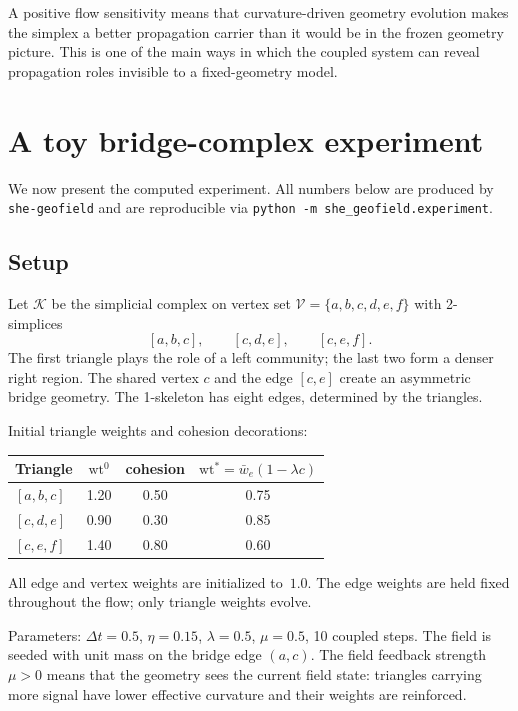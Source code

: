 \documentclass[11pt]{article}
\newcommand{\K}{\mathcal{K}}
\newcommand{\V}{\mathcal{V}}
\newcommand{\wt}{\mathrm{wt}}
\begin{document}
A positive flow sensitivity means that curvature-driven geometry evolution makes the simplex a better propagation carrier than it would be in the frozen geometry picture. This is one of the main ways in which the coupled system can reveal propagation roles invisible to a fixed-geometry model.

\section{A toy bridge-complex experiment}\label{sec:experiment}

We now present the computed experiment.  All numbers below are produced by \texttt{she-geofield} and are reproducible via \texttt{python -m she\_geofield.experiment}.

\subsection{Setup}

Let $\K$ be the simplicial complex on vertex set $\V=\{a,b,c,d,e,f\}$ with 2-simplices
\[
[a,b,c], \qquad [c,d,e], \qquad [c,e,f].
\]
The first triangle plays the role of a left community; the last two form a denser right region.  The shared vertex $c$ and the edge $[c,e]$ create an asymmetric bridge geometry.  The 1-skeleton has eight edges, determined by the triangles.

Initial triangle weights and cohesion decorations:

\begin{center}
\begin{tabular}{lccc}
\toprule
Triangle & $\wt^0$ & cohesion & $\wt^\ast = \bar w_e(1-\lambda c)$ \\
\midrule
$[a,b,c]$ & 1.20 & 0.50 & 0.75 \\
$[c,d,e]$ & 0.90 & 0.30 & 0.85 \\
$[c,e,f]$ & 1.40 & 0.80 & 0.60 \\
\bottomrule
\end{tabular}
\end{center}

\noindent All edge and vertex weights are initialized to~$1.0$.  The edge weights are held fixed throughout the flow; only triangle weights evolve.

Parameters: $\Delta t=0.5$, $\eta=0.15$, $\lambda=0.5$, $\mu=0.5$, 10 coupled steps.  The field is seeded with unit mass on the bridge edge $(a,c)$.  The field feedback strength $\mu>0$ means that the geometry sees the current field state: triangles carrying more signal have lower effective curvature and their weights are reinforced.
\end{document}
